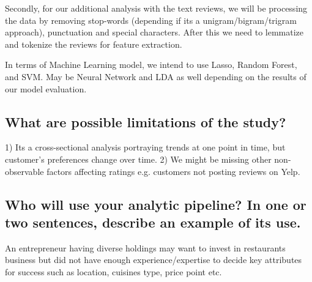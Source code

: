 \documentclass[twoside,11pt]{article}
\begin{document}
Secondly, for our additional analysis with the text reviews, we will be processing the data by removing stop-words (depending if its a unigram/bigram/trigram approach), punctuation and special characters. After this we need to lemmatize and tokenize the reviews for feature extraction.

In terms of Machine Learning model, we intend to use Lasso, Random Forest, and SVM. May be Neural Network and LDA as well depending on the results of our model evaluation. 


\subsection{What are possible limitations of the study?}
1) Its a cross-sectional analysis portraying trends at one point in time, but customer's preferences change over time.
2) We might be missing other non-observable factors affecting ratings e.g. customers not posting reviews on Yelp.

\subsection{Who will use your analytic pipeline? In one or two sentences, describe an example of its use.}
An entrepreneur having diverse holdings may want to invest in restaurants business but did not have enough experience/expertise to decide key attributes for success such as location, cuisines type, price point etc. 


\end{document}

